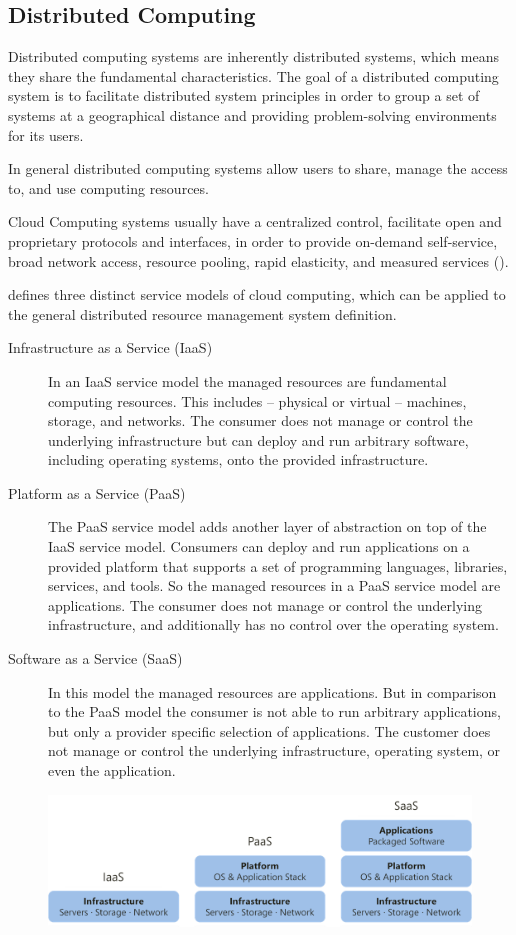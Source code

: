 \subsection{Distributed Computing}

Distributed computing systems are inherently distributed systems, which means
they share the fundamental characteristics. The goal of a distributed computing
system is to facilitate distributed system principles in order to group a set of
systems at a geographical distance and providing problem-solving environments
for its users.

In general distributed computing systems allow users to share, manage the
access to, and use computing resources.

Cloud Computing systems usually have a centralized control, facilitate open and
proprietary protocols and interfaces, in order to provide on-demand
self-service, broad network access, resource pooling, rapid elasticity, and
measured services (\cite{mell2011}).

 \cite{mell2011} defines three distinct service models of
cloud computing, which can be applied to the general distributed resource
management system definition.

\begin{description}
  \item[Infrastructure as a Service (IaaS)]
    In an IaaS service model the managed resources are fundamental computing
    resources. This includes -- physical or virtual -- machines, storage, and
    networks. The consumer does not manage or control the underlying
    infrastructure but can deploy and run arbitrary software, including
    operating systems, onto the provided infrastructure.

  \item[Platform as a Service (PaaS)]
    The PaaS service model adds another layer of abstraction on top of the IaaS
    service model. Consumers can deploy and run applications on a provided
    platform that supports a set of programming languages, libraries, services,
    and tools. So the managed resources in a PaaS service model are
    applications. The consumer does not manage or control the underlying
    infrastructure, and additionally has no control over the operating system.

  \item[Software as a Service (SaaS)]
    In this model the managed resources are applications. But in comparison to
    the PaaS model the consumer is not able to run arbitrary applications, but
    only a provider specific selection of applications. The customer does not
    manage or control the underlying infrastructure, operating system, or even
    the application.
\end{description}

\begin{figure}[ht]
  \centering
  \includegraphics[width=0.6\linewidth]{resources/distributed-computing-service-models.png}
\end{figure}

